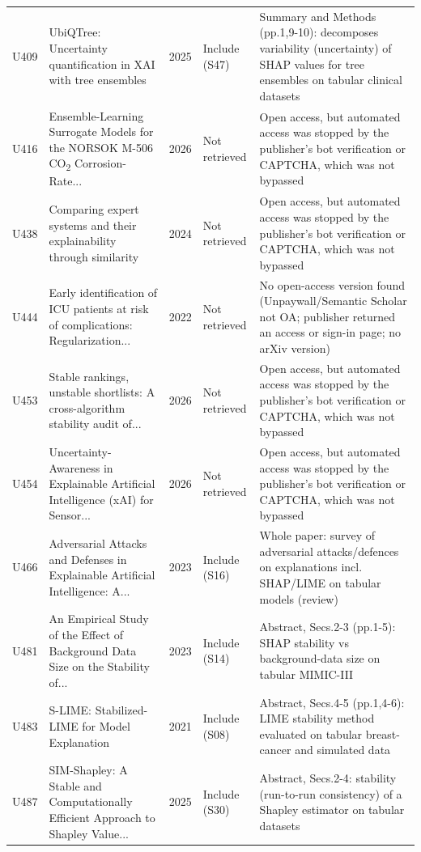 \begin{longtable}{@{}P{1.0cm}P{6.3cm}P{0.7cm}P{1.6cm}P{6.1cm}@{}}
U409 & UbiQTree: Uncertainty quantification in XAI with tree ensembles & 2025 & Include (S47) & Summary and Methods (pp.1,9-10): decomposes variability (uncertainty) of SHAP values for tree ensembles on tabular clinical datasets \\
U416 & Ensemble-Learning Surrogate Models for the NORSOK M-506 CO\textsubscript{2} Corrosion-Rate... & 2026 & Not retrieved & Open access, but automated access was stopped by the publisher's bot verification or CAPTCHA, which was not bypassed \\
U438 & Comparing expert systems and their explainability through similarity & 2024 & Not retrieved & Open access, but automated access was stopped by the publisher's bot verification or CAPTCHA, which was not bypassed \\
U444 & Early identification of ICU patients at risk of complications: Regularization... & 2022 & Not retrieved & No open-access version found (Unpaywall/\allowbreak{}Semantic Scholar not OA; publisher returned an access or sign-in page; no arXiv version) \\
U453 & Stable rankings, unstable shortlists: A cross-algorithm stability audit of... & 2026 & Not retrieved & Open access, but automated access was stopped by the publisher's bot verification or CAPTCHA, which was not bypassed \\
U454 & Uncertainty-Awareness in Explainable Artificial Intelligence (xAI) for Sensor... & 2026 & Not retrieved & Open access, but automated access was stopped by the publisher's bot verification or CAPTCHA, which was not bypassed \\
U466 & Adversarial Attacks and Defenses in Explainable Artificial Intelligence: A... & 2023 & Include (S16) & Whole paper: survey of adversarial attacks/\allowbreak{}defences on explanations incl. SHAP/\allowbreak{}LIME on tabular models (review) \\
U481 & An Empirical Study of the Effect of Background Data Size on the Stability of... & 2023 & Include (S14) & Abstract, Secs.2-3 (pp.1-5): SHAP stability vs background-data size on tabular MIMIC-III \\
U483 & S-LIME: Stabilized-LIME for Model Explanation & 2021 & Include (S08) & Abstract, Secs.4-5 (pp.1,4-6): LIME stability method evaluated on tabular breast-cancer and simulated data \\
U487 & SIM-Shapley: A Stable and Computationally Efficient Approach to Shapley Value... & 2025 & Include (S30) & Abstract, Secs.2-4: stability (run-to-run consistency) of a Shapley estimator on tabular datasets \\

\end{longtable}

